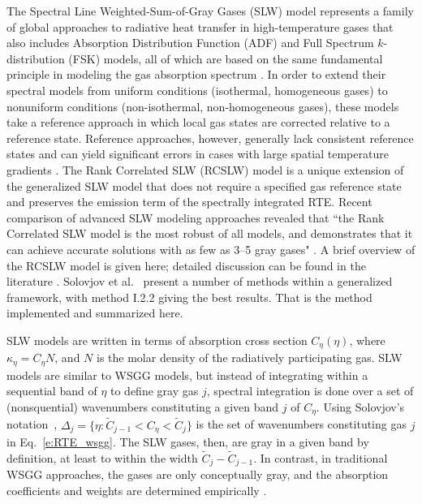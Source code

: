 \documentclass[preprint,12pt, a4paper]{elsarticle}
\begin{document}
The Spectral Line Weighted-Sum-of-Gray Gases (SLW) model represents a family of global approaches to radiative heat transfer in high-temperature gases that also includes Absorption Distribution Function (ADF) and Full Spectrum $k$-distribution (FSK) models, all of which are based on the same fundamental principle in modeling the gas absorption spectrum \cite{Solovjov_2016}. In order to extend their spectral models from uniform conditions (isothermal, homogeneous gases) to nonuniform conditions (non-isothermal, non-homogeneous gases), these models take a reference approach in which local gas states are corrected relative to a reference state. Reference approaches, however, generally lack consistent reference states and can yield significant errors in cases with large spatial temperature gradients \cite{Solovjov_2017}. The Rank Correlated SLW (RCSLW) model is a unique extension of the generalized SLW model that does not require a specified gas reference state and preserves the emission term of the spectrally integrated RTE. 
%
Recent comparison of advanced SLW modeling approaches revealed that ``the Rank Correlated SLW model is the most robust of all models, and demonstrates that it can achieve accurate solutions with as few as 3–5 gray gases" \citep{Badger_2019}. A brief overview of the RCSLW model is given here; detailed discussion can be found in the literature \cite{Solovjov_2000, Solovjov_2001, Solovjov_2008, Solovjov_2011, Solovjov_2014, Solovjov_2016, Solovjov_2017, Webb_2018}. 
Solovjov et al.~\cite{Solovjov_2017} present a number of methods within a generalized framework, with method I.2.2 giving the best results. That is the method implemented and summarized here.
%

SLW models are written in terms of absorption cross section $C_\eta(\eta)$, where $\kappa_\eta=C_\eta N$, and $N$ is the molar density of the radiatively participating gas. 
%
SLW models are similar to WSGG models, but instead of integrating within a sequential band of $\eta$ to define gray gas $j$, spectral integration is done over a set of (nonsquential) wavenumbers constituting a given band $j$ of $C_\eta$. 
Using Solovjov's notation~\cite{Solovjov_2017}, $\Delta_j=\{\eta:\tilde{C}_{j-1}<C_\eta<\tilde{C}_j\}$ is the set of wavenumbers constituting gas $j$ in Eq.~\ref{e:RTE_wsgg}.
%
The SLW gases, then, are gray in a given band by definition, at least to within the width $\tilde{C}_j-\tilde{C}_{j-1}$. In contrast, in traditional WSGG approaches, the gases are only conceptually gray, and the absorption coefficients and weights are determined empirically \cite{Badger_2019}. 
\end{document}
